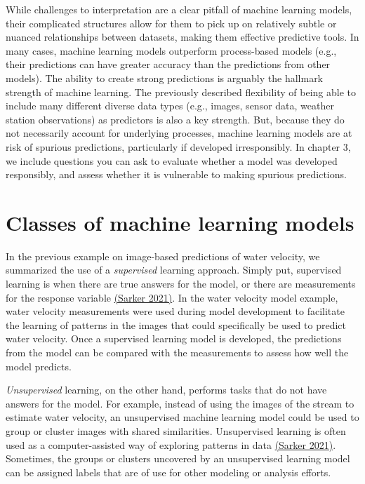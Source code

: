 \documentclass[
]{book}
\begin{document}
While challenges to interpretation are a clear pitfall of machine learning models, their complicated structures allow for them to pick up on relatively subtle or nuanced relationships between datasets, making them effective predictive tools. In many cases, machine learning models outperform process-based models (e.g., their predictions can have greater accuracy than the predictions from other models). The ability to create strong predictions is arguably the hallmark strength of machine learning. The previously described flexibility of being able to include many different diverse data types (e.g., images, sensor data, weather station observations) as predictors is also a key strength. But, because they do not necessarily account for underlying processes, machine learning models are at risk of spurious predictions, particularly if developed irresponsibly. In chapter 3, we include questions you can ask to evaluate whether a model was developed responsibly, and assess whether it is vulnerable to making spurious predictions.

\hypertarget{classes-of-machine-learning-models}{%
\section{Classes of machine learning models}\label{classes-of-machine-learning-models}}

In the previous example on image-based predictions of water velocity, we summarized the use of a \emph{supervised} learning approach. Simply put, supervised learning is when there are true answers for the model, or there are measurements for the response variable \href{https://doi.org/10.1007/s42979-021-00592-x}{(Sarker 2021)}. In the water velocity model example, water velocity measurements were used during model development to facilitate the learning of patterns in the images that could specifically be used to predict water velocity. Once a supervised learning model is developed, the predictions from the model can be compared with the measurements to assess how well the model predicts.

\emph{Unsupervised} learning, on the other hand, performs tasks that do not have answers for the model. For example, instead of using the images of the stream to estimate water velocity, an unsupervised machine learning model could be used to group or cluster images with shared similarities. Unsupervised learning is often used as a computer-assisted way of exploring patterns in data \href{https://doi.org/10.1007/s42979-021-00592-x}{(Sarker 2021)}. Sometimes, the groups or clusters uncovered by an unsupervised learning model can be assigned labels that are of use for other modeling or analysis efforts.
\end{document}
